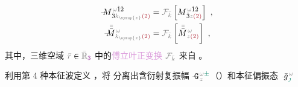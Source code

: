 \begin{subequations} \label{eq:C}
\begin{align}
	\Xint{\mathcolor{gray}{-}}{18}{M}^{\;\! \mathcolor{gray}{\omega} \hat{1} \hat{2} }_{\;\! \hat{3} \mathcolor{gray}{k_{\symup{z}}} \textcolor{Maroon}{(2)} } &= \mathcolor{gray}{\mathcal F_{\bar{k}}} \left[ M^{\;\! \mathcolor{gray}{\omega} \hat{1} \hat{2} }_{\;\! \hat{3} \mathcolor{gray}{z} \textcolor{Maroon}{(2)} } \right] ~, \label{eq:vec-C} \\
	\Xint{\mathcolor{gray}{-}}{18}{\bar{\bar{\bar{M}}}}^{\;\! \mathcolor{gray}{\omega} }_{\;\! \mathcolor{gray}{k_{\symup{z}}} \textcolor{Maroon}{(2)} } &= \mathcolor{gray}{\mathcal F_{\bar{k}}} \left[ \bar{\bar{\bar{M}}}^{\;\! \mathcolor{gray}{\omega} }_{\;\! \mathcolor{gray}{z} \textcolor{Maroon}{(2)} } \right] ~, \label{eq:components-C}
\end{align}
\end{subequations}
其中，三维空域 $\mathcolor{gray}{\bar{r}} \in \mathcolor{gray}{\bar{\mathbb{R}}_{\textcolor{Plum}{3}}}$ 中的\textcolor{Plum}{傅立叶正变换} $\mathcolor{gray}{\mathcal F_{\bar{k}}}$ 来自 。

利用第 4 种\textcolor{PineGreen}{本征波}定义 ，将  分离出\textcolor{PineGreen}{含衍射复振幅} $\Xint{\mathcolor{gray}{-}}{16}{\mathtt{G}}^{\;\!\mathcolor{gray}{\omega} \textcolor{PineGreen}{\pm}}_{\;\! \mathcolor{gray}{z}}$（）和\textcolor{PineGreen}{本征偏振态} $\Xint{{}^{}_{\mathcolor{gray}{-}}}{10}{\bar{g}}^{\;\!\mathcolor{gray}{\omega}}_{\;\! \textcolor{PineGreen}{\jmath}}$

